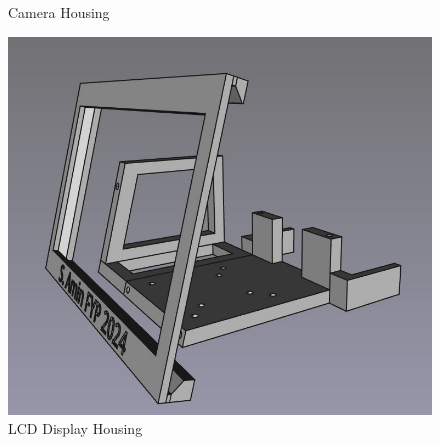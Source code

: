\begin{figure}
\begin{minipage}[t]{0.32\textwidth}
    \caption{Camera Housing}
    \label{fig:camerahousing}
  \end{minipage}
  \hfill
  \begin{minipage}[t]{0.32\textwidth}
    \centering
    \includegraphics[width=\textwidth]{imgs/freecad/lcd_mount.jpg}
    \caption{LCD Display Housing}
  \end{minipage}
\end{figure}











